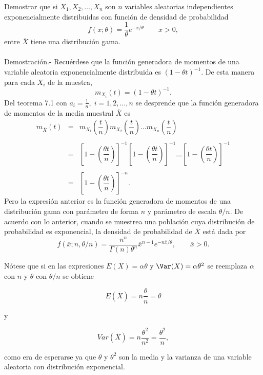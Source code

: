 \begin{ejem}

    Demostrar que si $X_1,X_2,\ldots,X_n$ son $n$ variables aleatorias independientes  exponencialmente distribuidas con función de densidad de probabilidad
    $$f(x;\theta)=\dfrac{1}{\theta}e^{-x/\theta}\qquad x>0,$$
    entre $\overline{X}$ tiene una distribución gama.\\\\
	Demostración.-\; Recuérdese que la función generadora de momentos de una variable aleatoria exponencialmente distribuida es $(1-\theta t)^{-1}$. De esta manera para cada $X_i$ de la muestra,
	$$m_{X_i}(t)=(1-\theta t)^{-1}.$$
	Del teorema 7.1 con $a_i=\frac{1}{n},\; i=1,2,\ldots , n$ se desprende que la función generadora de momentos de la media muestral $\overline{X}$ es 
	$$
	\begin{array}{rcl}
	    m_{\overline{X}}(t) &=& m_{X_i}\left(\dfrac{t}{n}\right)m_{X_2}\left(\dfrac{t}{n}\right)\ldots m_{X_n}\left(\dfrac{t}{n}\right)\\\\
				&=& \left[1-\left(\dfrac{\theta t}{n}\right)\right]^{-1}\left[1-\left(\dfrac{\theta t}{n}\right)\right]^{-1}\ldots \left[1-\left(\dfrac{\theta t}{n}\right)\right]^{-1}\\\\
				&=& \left[1-\left(\dfrac{\theta t}{n}\right)\right]^{-n}.
	\end{array}
	$$
	Pero la expresión anterior es la función generadora de momentos de una distribución gama con parámetro de forma $n$ y parámetro de escala $\theta/n$. De acuerdo con lo anterior, cuando se muestrea una población cuya distribución de probabilidad es exponencial, la densidad de probabilidad de $\overline{X}$ está dada por
	$$f(\overline{x};n,\theta/n)=\dfrac{n^n}{\Gamma (n) \theta^n}\overline{x}^{n-1}e^{-n\overline{x}/\theta},\qquad \overline{x}>0.$$
    \end{ejem}
Nótese que si en las expresiones $E(X)=\alpha\theta$ y $\Var(X)=\alpha\theta^2$ se reemplaza $\alpha$ con $n$ y $\theta$ con $\theta/n$ se obtiene
\begin{tcolorbox}
    $$E(\overline{X})=n\dfrac{\theta}{n}=\theta$$
\end{tcolorbox}
y
\begin{tcolorbox}
    $$Var(\overline{X})=n\dfrac{\theta^2}{n^2}=\dfrac{\theta^2}{n},$$
\end{tcolorbox}
como era de esperarse ya que $\theta$ y $\theta^2$ son la media y la varianza de una variable aleatoria con distribución exponencial.\\

